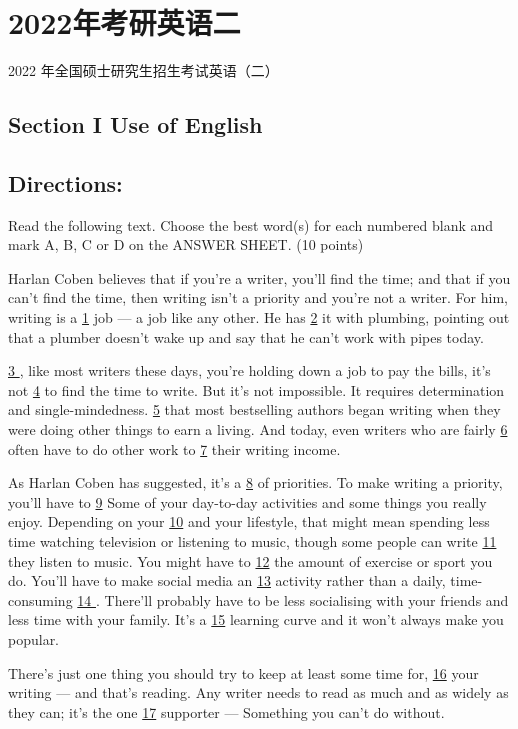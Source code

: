 \documentclass[UTF8,11pt]{ctexart}
\begin{document}
\section*{2022年考研英语二}
2022 年全国硕士研究生招生考试英语（二）


\subsection*{\textbf{Section I Use of English}}


\subsection*{\textbf{Directions:}}


Read the following text. Choose the best word(s) for each numbered blank and mark A, B, C or D on the ANSWER SHEET. (10 points)


Harlan Coben believes that if you’re a writer, you’ll find the time; and that if you can’t find the time, then writing isn’t a priority and you’re not a writer. For him, writing is a \uline{1} job — a job like any other. He has \uline{2} it with plumbing, pointing out that a plumber doesn’t wake up and say that he can’t work with pipes today.


\uline{3 }, like most writers these days, you’re holding down a job to pay the bills, it’s not \uline{4} to find the time to write. But it’s not impossible. It requires determination and single-mindedness. \uline{5} that most bestselling authors began writing when they were doing other things to earn a living. And today, even writers who are fairly \uline{6} often have to do other work to \uline{7} their writing income.


As Harlan Coben has suggested, it’s a \uline{8} of priorities. To make writing a priority, you’ll have to \uline{9} Some of your day-to-day activities and some things you really enjoy. Depending on your \uline{10} and your lifestyle, that might mean spending less time watching television or listening to music, though some people can write \uline{11} they listen to music. You might have to \uline{12} the amount of exercise or sport you do. You’ll have to make social media an \uline{13} activity rather than a daily, time-consuming \uline{14 }. There’ll probably have to be less socialising with your friends and less time with your family. It’s a \uline{15} learning curve and it won’t always make you popular.


There’s just one thing you should try to keep at least some time for, \uline{16} your writing — and that’s reading. Any writer needs to read as much and as widely as they can; it’s the one \uline{17} supporter — Something you can’t do without.
\end{document}
